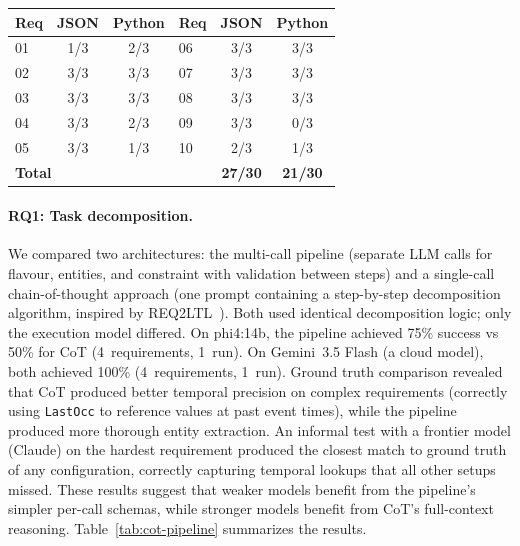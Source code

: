 \vspace{0.5em}
\noindent
\footnotesize
\renewcommand{\arraystretch}{1.3}
\begin{tabular*}{\columnwidth}{@{\extracolsep{\fill}}lcc|lcc@{}}
\toprule
\textbf{Req} & \textbf{JSON} & \textbf{Python} & \textbf{Req} & \textbf{JSON} & \textbf{Python} \\
\midrule
01 & 1/3 & 2/3 & 06 & 3/3 & 3/3 \\
02 & 3/3 & 3/3 & 07 & 3/3 & 3/3 \\
03 & 3/3 & 3/3 & 08 & 3/3 & 3/3 \\
04 & 3/3 & 2/3 & 09 & 3/3 & 0/3 \\
05 & 3/3 & 1/3 & 10 & 2/3 & 1/3 \\
\midrule
\multicolumn{4}{l}{\textbf{Total}} & \textbf{27/30} & \textbf{21/30} \\
\bottomrule
\end{tabular*}
\label{tab:python-json}
\renewcommand{\arraystretch}{1.0}
\normalsize
\vspace{0.5em}

\paragraph{RQ1: Task decomposition.}
We compared two architectures: the multi-call pipeline (separate LLM
calls for flavour, entities, and constraint with validation between
steps) and a single-call chain-of-thought approach (one prompt containing
a step-by-step decomposition algorithm, inspired by
REQ2LTL~\cite{ma2025req2ltl}). Both used identical decomposition logic;
only the execution model differed. On phi4:14b, the pipeline achieved 75\%
success vs 50\% for CoT (4~requirements, 1~run). On Gemini~3.5 Flash (a
cloud model), both achieved 100\% (4~requirements, 1~run). Ground truth
comparison revealed that CoT produced better temporal precision on complex
requirements (correctly using \texttt{LastOcc} to reference values at
past event times), while the pipeline produced more thorough entity
extraction. An informal test with a frontier model (Claude) on the
hardest requirement produced the closest match to ground truth of any
configuration, correctly capturing temporal lookups that all other setups
missed. These results suggest that weaker models benefit from the
pipeline's simpler per-call schemas, while stronger models benefit from
CoT's full-context reasoning. Table~\ref{tab:cot-pipeline} summarizes
the results.

